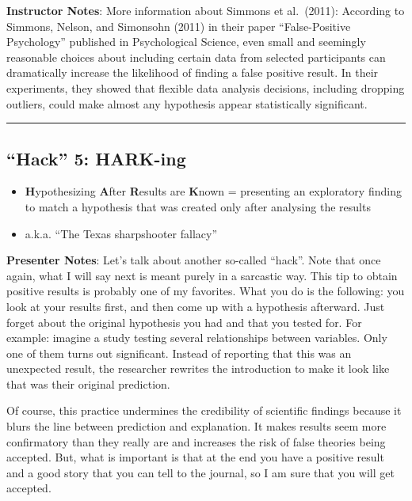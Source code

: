 \documentclass[
  english,
  letterpaper,
  DIV=11,
  numbers=noendperiod]{scrartcl}
\providecommand{\tightlist}{%
  \setlength{\itemsep}{0pt}\setlength{\parskip}{0pt}}
\begin{document}
\textbf{Instructor Notes}: More information about Simmons et al.~(2011):
According to Simmons, Nelson, and Simonsohn (2011) in their paper
``False-Positive Psychology'' published in Psychological Science, even
small and seemingly reasonable choices about including certain data from
selected participants can dramatically increase the likelihood of
finding a false positive result. In their experiments, they showed that
flexible data analysis decisions, including dropping outliers, could
make almost any hypothesis appear statistically significant.

\begin{center}\rule{0.5\linewidth}{0.5pt}\end{center}

\subsection{``Hack'' 5: HARK-ing}\label{hack-5-hark-ing}

\begin{itemize}
\tightlist
\item
  \textbf{H}ypothesizing \textbf{A}fter \textbf{R}esults are
  \textbf{K}nown = presenting an exploratory finding to match a
  hypothesis that was created only after analysing the results
\item
  a.k.a. ``The Texas sharpshooter fallacy''
\end{itemize}

\textbf{Presenter Notes}: Let's talk about another so-called ``hack''.
Note that once again, what I will say next is meant purely in a
sarcastic way. This tip to obtain positive results is probably one of my
favorites. What you do is the following: you look at your results first,
and then come up with a hypothesis afterward. Just forget about the
original hypothesis you had and that you tested for. For example:
imagine a study testing several relationships between variables. Only
one of them turns out significant. Instead of reporting that this was an
unexpected result, the researcher rewrites the introduction to make it
look like that was their original prediction.

Of course, this practice undermines the credibility of scientific
findings because it blurs the line between prediction and explanation.
It makes results seem more confirmatory than they really are and
increases the risk of false theories being accepted. But, what is
important is that at the end you have a positive result and a good story
that you can tell to the journal, so I am sure that you will get
accepted.
\end{document}
